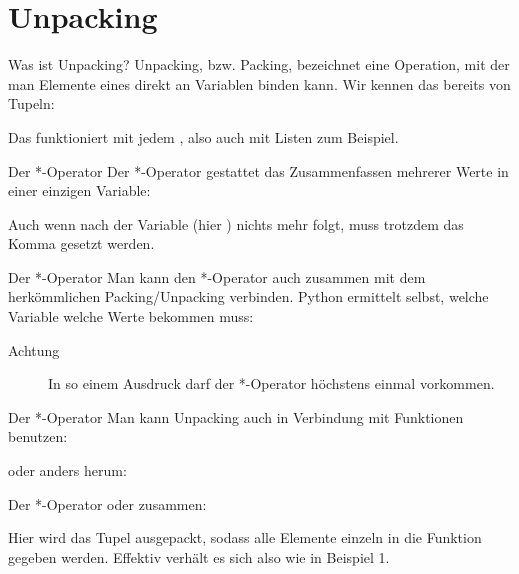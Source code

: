 \section{Unpacking}

\begin{frame}{Was ist Unpacking?}
	Unpacking, bzw. Packing, bezeichnet eine Operation, mit der man Elemente eines  direkt an Variablen binden kann. Wir kennen das bereits von Tupeln:
	
	Das funktioniert mit jedem , also auch mit Listen zum Beispiel.
\end{frame}

\begin{frame}{Der *-Operator}
	Der *-Operator gestattet das Zusammenfassen mehrerer Werte in einer einzigen Variable:
	
	Auch wenn nach der Variable (hier ) nichts mehr folgt, muss trotzdem das Komma gesetzt werden.
\end{frame}

\begin{frame}{Der *-Operator}
	Man kann den *-Operator auch zusammen mit dem herkömmlichen Packing/Unpacking verbinden. Python ermittelt selbst, welche Variable welche Werte bekommen muss:
	
	\begin{description}
		\item[Achtung] In so einem Ausdruck darf der *-Operator höchstens einmal vorkommen.
	\end{description}
\end{frame}

\begin{frame}{Der *-Operator}
	Man kann Unpacking auch in Verbindung mit Funktionen benutzen:
	
	oder anders herum:
	
\end{frame}

\begin{frame}{Der *-Operator}
	oder zusammen:
	
	Hier wird das Tupel ausgepackt, sodass alle Elemente einzeln in die Funktion gegeben werden. Effektiv verhält es sich also wie in Beispiel 1.
\end{frame}

